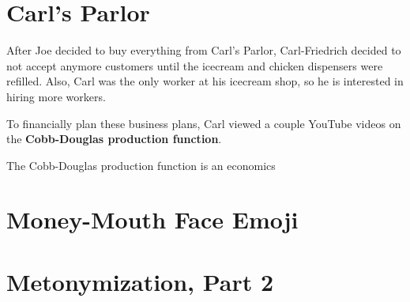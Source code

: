 \setcounter{chapter}{7}
\chapter{Carl's Parlor}
After Joe decided to buy everything from Carl's Parlor, Carl-Friedrich decided to not accept anymore customers until the icecream and chicken dispensers were refilled.
Also, Carl was the only worker at his icecream shop, so he is interested in hiring more workers.

To financially plan these business plans, Carl viewed a couple YouTube videos on the \textbf{Cobb-Douglas production function}.
\begin{remark}
	The Cobb-Douglas production function is an economics 
\end{remark}

\setcounter{chapter}{8}
\chapter{Money-Mouth Face Emoji}

\setcounter{chapter}{9}
\chapter{Metonymization, Part 2}